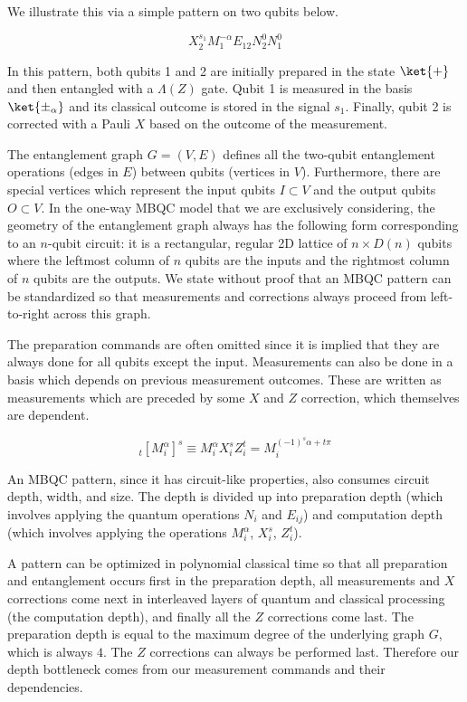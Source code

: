 \begin{description}
We illustrate this via a simple pattern on two qubits below.

\begin{equation}
X^{s_1}_2 M^{-\alpha}_1 E_{12} N^{0}_2 N^{0}_1
\end{equation}

In this pattern, both qubits 1 and 2 are initially prepared in the
state $\ket{+}$ and then entangled with a $\Lambda(Z)$ gate.
Qubit 1 is measured in the basis $\ket{\pm_{\alpha}}$ and its
classical outcome is stored in the signal $s_1$. Finally,
qubit 2 is corrected with a Pauli $X$ based on the outcome of
the measurement.

The entanglement graph $G = (V,E)$ defines all the two-qubit entanglement
operations (edges in $E$) between qubits (vertices in $V$). Furthermore,
there are special vertices which represent the input
qubits $I \subset V$ and the output qubits $O \subset V$. In the one-way
MBQC model that we are exclusively considering,
the geometry of the entanglement graph always has the following form
corresponding to an $n$-qubit circuit: it is a
rectangular, regular 2D lattice of $n \times D(n)$ qubits where the
leftmost column of $n$ qubits are the inputs and the rightmost
column of $n$ qubits are the outputs. We state without proof that an
MBQC pattern can be standardized so that measurements and corrections
always proceed from left-to-right across this graph.

The preparation commands are often omitted since it is implied that they
are always done for all qubits except the input.
Measurements can also be done in a basis which depends on previous
measurement outcomes. These are written as measurements which are
preceded by some $X$ and $Z$ correction, which themselves are dependent.

\begin{equation}
_t\left[M^{\alpha}_i\right]^s \equiv M^{\alpha}_i X^s_i Z^t_i =
M_i^{(-1)^s \alpha + t\pi}
\end{equation}

An MBQC pattern, since it has circuit-like properties, also consumes
circuit depth, width, and size. The depth is divided up into
preparation depth (which involves applying the quantum operations
$N_i$ and $E_{ij}$) and computation depth (which involves applying
the operations $M^{\alpha}_i$, $X^{s}_i$, $Z^{t}_i$).

A pattern can be optimized in polynomial classical time so that
all preparation and entanglement occurs first in the preparation depth,
all measurements and $X$ corrections come next in interleaved layers of
quantum and classical processing (the computation depth),
and finally all the $Z$ corrections come
last. The preparation depth is equal to the maximum degree of the
underlying graph $G$, which is always $4$. The $Z$ corrections can
always be performed last.
Therefore our depth bottleneck
comes from our measurement commands and their dependencies.


\end{description}
